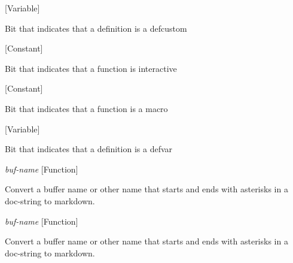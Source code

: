 \vspace{1em}
\noindent
{}
\usebox{\funcname}
 \hfill [Variable]

\begin{doc-string}
Bit that indicates that a definition is a defcustom
\end{doc-string}

\vspace{1em}
\noindent
{}
\usebox{\funcname}
 \hfill [Constant]

\begin{doc-string}
Bit that indicates that a function is interactive
\end{doc-string}

\vspace{1em}
\noindent
{}
\usebox{\funcname}
 \hfill [Constant]

\begin{doc-string}
Bit that indicates that a function is a macro
\end{doc-string}

\vspace{1em}
\noindent
{}
\usebox{\funcname}
 \hfill [Variable]

\begin{doc-string}
Bit that indicates that a definition is a defvar
\end{doc-string}

\vspace{1em}
\noindent
{}
\usebox{\funcname}\emph{buf-name}
 \hfill [Function]

\begin{doc-string}
Convert a buffer name or other name that starts and ends with asterisks
 in a doc-string to markdown.
\end{doc-string}

\vspace{1em}
\noindent
{}
\usebox{\funcname}\emph{buf-name}
 \hfill [Function]

\begin{doc-string}
Convert a buffer name or other name that starts and ends with asterisks
 in a doc-string to markdown.
\end{doc-string}


